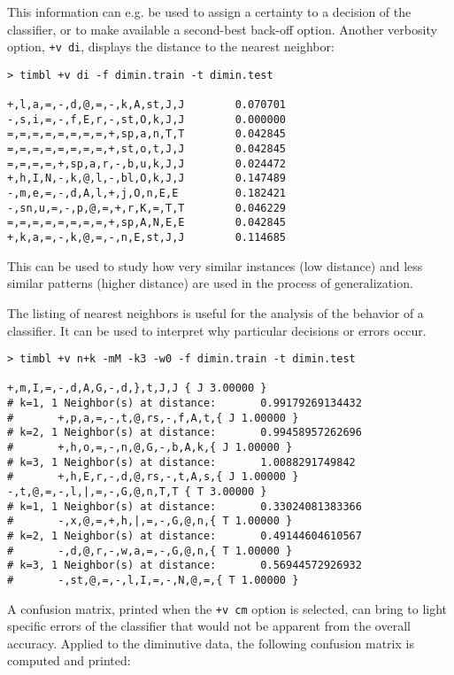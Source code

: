 \documentclass{book}
\begin{document}
This information can e.g. be used to assign a certainty to a decision
of the classifier, or to make available a second-best back-off
option. Another verbosity option, {\tt +v di}, displays the distance
to the nearest neighbor:

{\footnotesize
\begin{verbatim}
> timbl +v di -f dimin.train -t dimin.test

+,l,a,=,-,d,@,=,-,k,A,st,J,J        0.070701
-,s,i,=,-,f,E,r,-,st,O,k,J,J        0.000000
=,=,=,=,=,=,=,=,+,sp,a,n,T,T        0.042845
=,=,=,=,=,=,=,=,+,st,o,t,J,J        0.042845
=,=,=,=,+,sp,a,r,-,b,u,k,J,J        0.024472
+,h,I,N,-,k,@,l,-,bl,O,k,J,J        0.147489
-,m,e,=,-,d,A,l,+,j,O,n,E,E         0.182421
-,sn,u,=,-,p,@,=,+,r,K,=,T,T        0.046229
=,=,=,=,=,=,=,=,+,sp,A,N,E,E        0.042845
+,k,a,=,-,k,@,=,-,n,E,st,J,J        0.114685        
\end{verbatim}
}

This can be used to study how very similar instances (low distance) and
less similar patterns (higher distance) are used in the process of
generalization.

The listing of nearest neighbors is useful for the analysis of the
behavior of a classifier. It can be used to interpret why particular
decisions or errors occur.

{\footnotesize
\begin{verbatim}
> timbl +v n+k -mM -k3 -w0 -f dimin.train -t dimin.test

+,m,I,=,-,d,A,G,-,d,},t,J,J { J 3.00000 }
# k=1, 1 Neighbor(s) at distance:       0.99179269134432
#       +,p,a,=,-,t,@,rs,-,f,A,t,{ J 1.00000 }
# k=2, 1 Neighbor(s) at distance:       0.99458957262696
#       +,h,o,=,-,n,@,G,-,b,A,k,{ J 1.00000 }
# k=3, 1 Neighbor(s) at distance:       1.0088291749842
#       +,h,E,r,-,d,@,rs,-,t,A,s,{ J 1.00000 }
-,t,@,=,-,l,|,=,-,G,@,n,T,T { T 3.00000 }
# k=1, 1 Neighbor(s) at distance:       0.33024081383366
#       -,x,@,=,+,h,|,=,-,G,@,n,{ T 1.00000 }
# k=2, 1 Neighbor(s) at distance:       0.49144604610567
#       -,d,@,r,-,w,a,=,-,G,@,n,{ T 1.00000 }
# k=3, 1 Neighbor(s) at distance:       0.56944572926932
#       -,st,@,=,-,l,I,=,-,N,@,=,{ T 1.00000 }
\end{verbatim}
}

A confusion matrix, printed when the {\tt +v cm} option is selected,
can bring to light specific errors of the classifier that would not be
apparent from the overall accuracy. Applied to the diminutive data,
the following confusion matrix is computed and printed:
\end{document}
